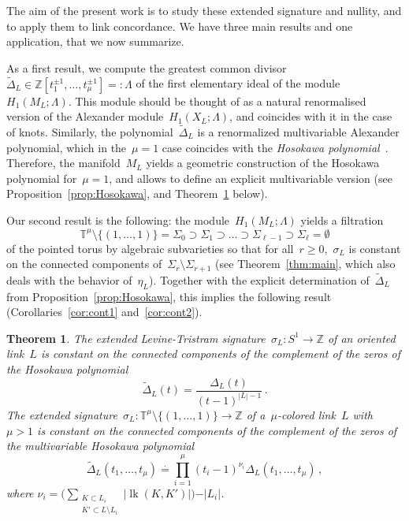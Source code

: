 \documentclass{amsart}
\newcommand{\Z}{\mathbb{Z}}
\newcommand{\T}{\mathbb{T}}
\DeclareMathOperator{\lk}{lk}
\newtheorem{thm}{Theorem}[section]
\theoremstyle{definition}
\theoremstyle{remark}
\begin{document}
\medskip

The aim of the present work is to study these extended signature and nullity, and to apply them to link concordance.
We have three main results and one application, that we now summarize.

As a first result, we compute the greatest common divisor~$\widetilde\Delta_L\in\Z[t_1^{\pm 1},\dots,t_\mu^{\pm 1}]=:\Lambda$
of the first elementary ideal of the module~$H_1(M_L;\Lambda)$. This module should be thought of as a natural
renormalised version of the Alexander module~$H_1(X_L;\Lambda)$, and coincides with it in the case of knots.
Similarly, the polynomial~$\widetilde\Delta_L$ is a renormalized multivariable Alexander polynomial, which in the~$\mu=1$ case coincides with the {\em Hosokawa polynomial\/}~\cite{Hos}.
Therefore, the manifold~$M_L$ yields a geometric construction of the Hosokawa polynomial for~$\mu=1$, and allows to define an explicit multivariable version (see Proposition~\ref{prop:Hosokawa}, and Theorem~\ref{thm:intro-const} below).

Our second result is the following: the module~$H_1(M_L;\Lambda)$ yields a filtration
\[
\T^\mu\setminus\{(1,\dots,1)\}=\Sigma_0\supset\Sigma_1\supset\dots\supset\Sigma_{\ell-1}\supset\Sigma_\ell=\emptyset
\]
of the pointed torus by algebraic subvarieties so that for all~$r\ge 0$,~$\sigma_L$  is constant on the connected components of~$\Sigma_r\setminus\Sigma_{r+1}$ (see Theorem~\ref{thm:main}, which also deals with the behavior of~$\eta_L$). Together with the explicit determination of~$\widetilde{\Delta}_L$
from Proposition~\ref{prop:Hosokawa}, this implies the following result (Corollaries~\ref{cor:cont1} and~\ref{cor:cont2}).

\begin{thm}
\label{thm:intro-const}
	The extended Levine-Tristram signature~$\sigma_L\colon S^1\to\Z$ of an oriented link~$L$ is constant on
	the connected components of the complement of the zeros of the Hosokawa polynomial
	\[
	\widetilde\Delta_L(t)=\frac{\Delta_L(t)}{(t-1)^{|L|-1}}\,.
	\]
	The extended signature~$\sigma_L\colon \T^\mu\setminus\{(1,\dots,1)\}\to\Z$ of a~$\mu$-colored link~$L$ with~$\mu>1$ 
	is constant on the connected components of the complement of the zeros of the multivariable Hosokawa polynomial
	\[
	\widetilde\Delta_L(t_1,\dots,t_\mu)\stackrel{\cdot}{=}\prod_{i=1}^\mu (t_i-1)^{\nu_i}\Delta_L(t_1,\dots,t_\mu)\,,
	\]
	where $\nu_i=\Big(\sum_{\substack{K\subset L_i\\ K'\subset L\setminus L_i}}\vert\lk(K,K')\vert\Big)-\vert L_i\vert$.
\end{thm}
\end{document}
